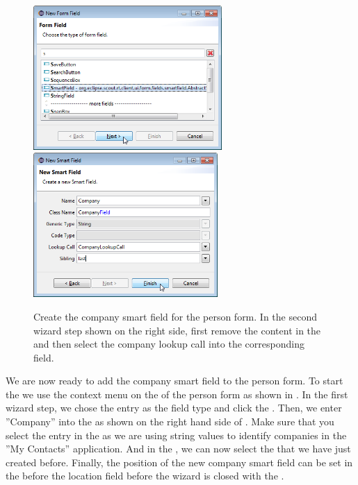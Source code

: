\documentclass[a4paper,10pt,twoside]{book}
\begin{document}
\begin{figure}
\includegraphics[height=5.5cm]{new_smartfield_company_1.png} \hspace{5mm}
\includegraphics[height=5.5cm]{new_smartfield_company_2.png}
\caption{Create the company smart field for the person form. In the second wizard step shown on the right side, first remove the content in the  and then select the company lookup call into the corresponding field.}
\end{figure}

We are now ready to add the company smart field to the person form. 
To start the  we use the context menu on the  of the person form as shown in .
In the first wizard step, we chose the  entry as the field type and click the . 
Then, we enter ''Company'' into the  as shown on the right hand side of . 
Make sure that you select the  entry in the  as we are using string values to identify companies in the ''My Contacts'' application. 
And in the , we can now select the  that we have just created before. 
Finally, the position of the new company smart field can be set in the  before the location field before the wizard is closed with the . 
\end{document}
